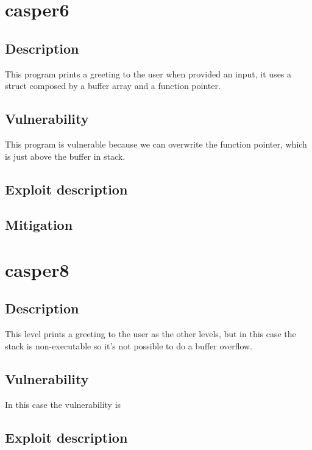 \documentclass[a4paper,12pt]{article}
\begin{document}
\section{casper6}


\subsection{Description}

This program prints a greeting to the user when provided an input, it uses a struct composed by a buffer array and a function pointer.

\subsection{Vulnerability}

This program is vulnerable because we can overwrite the function pointer, which is just above the buffer in stack.

\subsection{Exploit description}

\subsection{Mitigation}

\section{casper8}
\subsection{Description}

This level prints a greeting to the user as the other levels, but in this case the stack is non-executable so it's not possible to do a buffer overflow.
\subsection{Vulnerability}

In this case the vulnerability is 

\subsection{Exploit description} 
\end{document}
